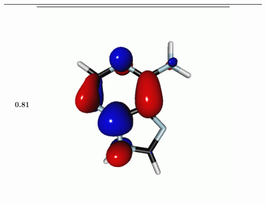 \documentclass[journal=jctcce,manuscript=article]{achemso}
\begin{document}
\begin{table}[H]
\begin{tabular}{ l| c c c | c c c }
\begin{minipage}{0.2\textwidth}
    \end{minipage}
    & 0.81
    & 
    \begin{minipage}{0.2\textwidth}
        \centering
        \includegraphics[scale=0.10]{NTO/Adenine_C/6p_Cs.png}
    \end{minipage}
    \\
    \hline
\end{tabular}
\end{table}
\end{document}
